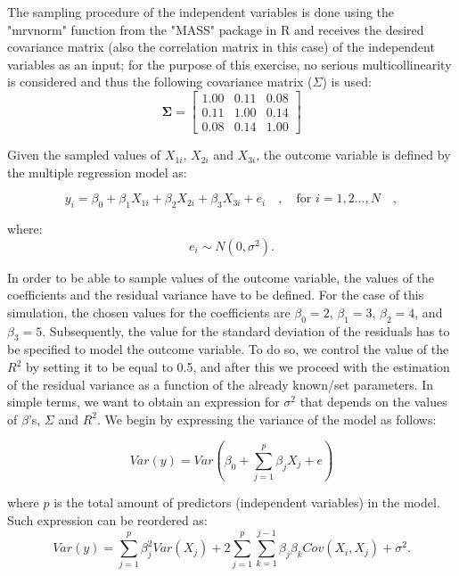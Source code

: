 \documentclass[a4paper]{article}
\begin{document}
\vspace{2mm}
\noindent
The sampling procedure of the independent variables is done using the "mrvnorm" function from the "MASS" package in R \citep{masslibrary} and receives the desired covariance matrix (also the correlation matrix in this case) of the independent variables as an input; for the purpose of this exercise, no serious multicollinearity is considered and thus the following covariance matrix (\textbf{$\Sigma{}$}) is used:
\[
\mathbf{\Sigma}=
\begin{bmatrix}
1.00 & 0.11 & 0.08 \\
0.11 & 1.00 & 0.14 \\
0.08 & 0.14 & 1.00
\end{bmatrix}
\]

\vspace{1.5mm}
\noindent
Given the sampled values of $X_{1i}$, $X_{2i}$ and $X_{3i}$, the outcome variable is defined by the multiple regression model as:

\begin{equation}
y_i=\beta_{0}+\beta_{1}X_{1i}+\beta_{2}X_{2i}+\beta_{3}X_{3i}+e_i \quad , \quad \text{for } i=1,2...,N \quad ,
\end{equation}

\noindent
where:
\begin{equation*}
e_i\sim{}N(0,\sigma^{2}).
\end{equation*}

\vspace{3mm}
\noindent
In order to be able to sample values of the outcome variable, the values of the coefficients and the residual variance have to be defined. For the case of this simulation, the chosen values for the coefficients are $\beta_0=2$, $\beta_1=3$, $\beta_2=4$, and $\beta_3=5$. Subsequently, the value for the standard deviation of the residuals has to be specified to model the outcome variable. To do so, we control the value of the $R^2$ by setting it to be equal to 0.5, and after this we proceed with the estimation of the residual variance as a function of the already known/set parameters. In simple terms, we want to obtain an expression for $\sigma^2$ that depends on the values of $\beta$'s, \textbf{$\Sigma$} and $R^2$. We begin by expressing the variance of the model as follows:

\begin{equation*}
Var(y)=Var(\beta_{0}+\sum_{j=1}^p\beta_{j}X_{j}+e)
\end{equation*}

\noindent
where $p$ is the total amount of predictors (independent variables) in the model. Such expression can be reordered as:
\begin{equation*}
Var(y)=\sum_{j=1}^p\beta_{j}^2Var(X_{j})+2\sum_{j=1}^p\sum_{k=1}^{j-1}\beta_{j}\beta_{k}Cov(X_{i},X_{j})+\sigma^2.
\end{equation*}
\end{document}
